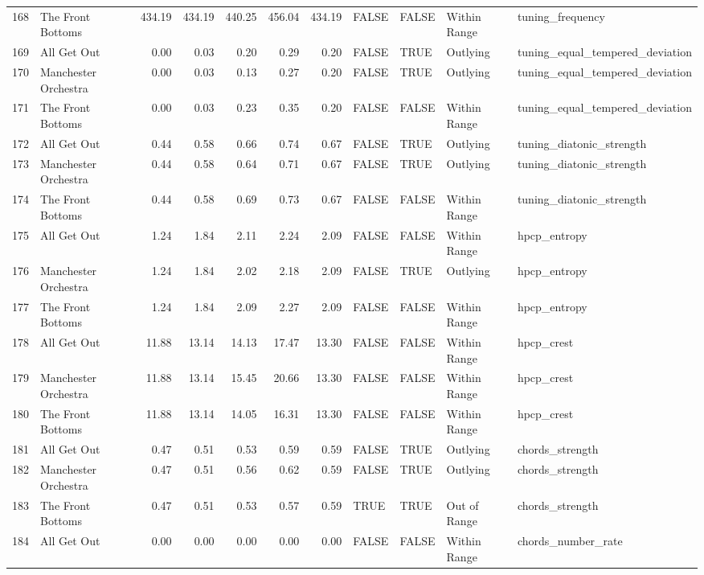 \begin{table}[ht]
\begin{tabular}{rlrrrrrllll}
  168 & The Front Bottoms & 434.19 & 434.19 & 440.25 & 456.04 & 434.19 & FALSE & FALSE & Within Range & tuning\_frequency \\ 
  169 & All Get Out & 0.00 & 0.03 & 0.20 & 0.29 & 0.20 & FALSE & TRUE & Outlying & tuning\_equal\_tempered\_deviation \\ 
  170 & Manchester Orchestra & 0.00 & 0.03 & 0.13 & 0.27 & 0.20 & FALSE & TRUE & Outlying & tuning\_equal\_tempered\_deviation \\ 
  171 & The Front Bottoms & 0.00 & 0.03 & 0.23 & 0.35 & 0.20 & FALSE & FALSE & Within Range & tuning\_equal\_tempered\_deviation \\ 
  172 & All Get Out & 0.44 & 0.58 & 0.66 & 0.74 & 0.67 & FALSE & TRUE & Outlying & tuning\_diatonic\_strength \\ 
  173 & Manchester Orchestra & 0.44 & 0.58 & 0.64 & 0.71 & 0.67 & FALSE & TRUE & Outlying & tuning\_diatonic\_strength \\ 
  174 & The Front Bottoms & 0.44 & 0.58 & 0.69 & 0.73 & 0.67 & FALSE & FALSE & Within Range & tuning\_diatonic\_strength \\ 
  175 & All Get Out & 1.24 & 1.84 & 2.11 & 2.24 & 2.09 & FALSE & FALSE & Within Range & hpcp\_entropy \\ 
  176 & Manchester Orchestra & 1.24 & 1.84 & 2.02 & 2.18 & 2.09 & FALSE & TRUE & Outlying & hpcp\_entropy \\ 
  177 & The Front Bottoms & 1.24 & 1.84 & 2.09 & 2.27 & 2.09 & FALSE & FALSE & Within Range & hpcp\_entropy \\ 
  178 & All Get Out & 11.88 & 13.14 & 14.13 & 17.47 & 13.30 & FALSE & FALSE & Within Range & hpcp\_crest \\ 
  179 & Manchester Orchestra & 11.88 & 13.14 & 15.45 & 20.66 & 13.30 & FALSE & FALSE & Within Range & hpcp\_crest \\ 
  180 & The Front Bottoms & 11.88 & 13.14 & 14.05 & 16.31 & 13.30 & FALSE & FALSE & Within Range & hpcp\_crest \\ 
  181 & All Get Out & 0.47 & 0.51 & 0.53 & 0.59 & 0.59 & FALSE & TRUE & Outlying & chords\_strength \\ 
  182 & Manchester Orchestra & 0.47 & 0.51 & 0.56 & 0.62 & 0.59 & FALSE & TRUE & Outlying & chords\_strength \\ 
  183 & The Front Bottoms & 0.47 & 0.51 & 0.53 & 0.57 & 0.59 & TRUE & TRUE & Out of Range & chords\_strength \\ 
  184 & All Get Out & 0.00 & 0.00 & 0.00 & 0.00 & 0.00 & FALSE & FALSE & Within Range & chords\_number\_rate \\ 

\end{tabular}
\end{table}
